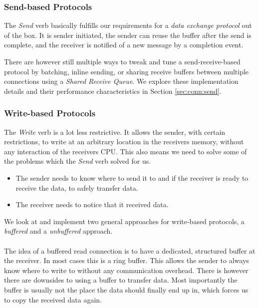\subsubsection{Send-based Protocols}
The \emph{Send} verb basically fulfills our requirements for a \emph{data exchange protocol} out of the box. It is sender
initiated, the sender can reuse the buffer after the send is complete, and the receiver is notified of a new message by
a completion event.

There are however still multiple ways to tweak and tune a send-receive-based protocol by batching, inline sending, or 
sharing receive buffers between multiple connections using a \emph{Shared Receive Queue}. We explore these implementation 
details and their performance characteristics in Section \ref{sec:conn:send}.

\subsubsection{Write-based Protocols}
The \emph{Write} verb is a lot less restrictive. It allows the sender, with certain restrictions, to write at an arbitrary 
location in the receivers memory, without any interaction of the receivers CPU. This also means we need to solve some of the 
problems which the \emph{Send} verb solved for us.

\begin{itemize}
  \item The sender needs to know where to send it to and if the receiver is ready to receive the data, to safely transfer data.

  \item The receiver needs to notice that it received data.
\end{itemize}

We look at and implement two general approaches for write-based protocols, a \emph{buffered} and a \emph{unbuffered} approach.

\paragraph{} The idea of a buffered read connection is to have a dedicated, structured buffer at the receiver. In most cases 
this is a ring buffer. This allows the sender to always know where to write to without any communication overhead. There is
however there are downsides to using a buffer to transfer data. Most importantly the buffer is usually not the place the 
data should finally end up in, which forces us to copy the received data again.

